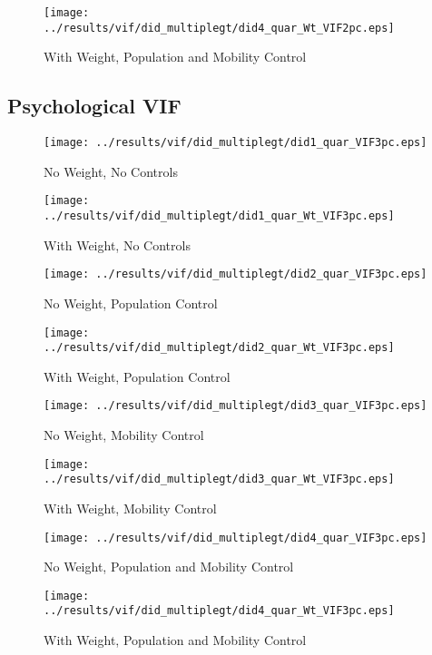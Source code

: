 \documentclass[11pt,letterpaper]{article}
\begin{document}
\begin{figure}[H]
\caption{With Weight, Population and Mobility Control}
\centering
\texttt{[image: ../results/vif/did\_multiplegt/did4\_quar\_Wt\_VIF2pc.eps]}
\end{figure}

\subsection{Psychological VIF}
\begin{figure}[H]
\caption{No Weight, No Controls}
\centering
\texttt{[image: ../results/vif/did\_multiplegt/did1\_quar\_VIF3pc.eps]}
\end{figure}

\begin{figure}[H]
\caption{With Weight, No Controls}
\centering
\texttt{[image: ../results/vif/did\_multiplegt/did1\_quar\_Wt\_VIF3pc.eps]}
\end{figure}
\begin{figure}[H]
\caption{No Weight, Population Control}
\centering
\texttt{[image: ../results/vif/did\_multiplegt/did2\_quar\_VIF3pc.eps]}
\end{figure}

\begin{figure}[H]
\caption{With Weight, Population Control}
\centering
\texttt{[image: ../results/vif/did\_multiplegt/did2\_quar\_Wt\_VIF3pc.eps]}
\end{figure}
\begin{figure}[H]
\caption{No Weight, Mobility Control}
\centering
\texttt{[image: ../results/vif/did\_multiplegt/did3\_quar\_VIF3pc.eps]}
\end{figure}

\begin{figure}[H]
\caption{With Weight, Mobility Control}
\centering
\texttt{[image: ../results/vif/did\_multiplegt/did3\_quar\_Wt\_VIF3pc.eps]}
\end{figure}
\begin{figure}[H]
\caption{No Weight, Population and Mobility Control}
\centering
\texttt{[image: ../results/vif/did\_multiplegt/did4\_quar\_VIF3pc.eps]}
\end{figure}

\begin{figure}[H]
\caption{With Weight, Population and Mobility Control}
\centering
\texttt{[image: ../results/vif/did\_multiplegt/did4\_quar\_Wt\_VIF3pc.eps]}
\end{figure}
\end{document}
